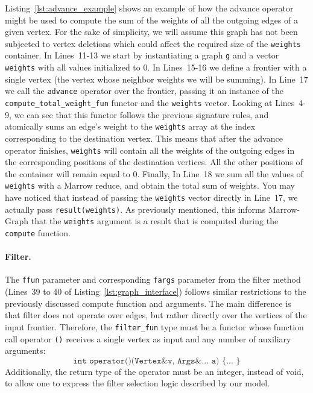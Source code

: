 Listing~\ref{lst:advance_example} shows an example of how the advance operator might be used to compute the sum of the weights of all the outgoing edges of a given vertex. For the sake of simplicity, we will assume this graph has not been subjected to vertex deletions which could affect the required size of the \texttt{weights} container. In Lines~11-13 we start by instantiating a graph \texttt{g} and a vector \texttt{weights} with all values initialized to 0. In Lines~15-16 we define a frontier with a single vertex (the vertex whose neighbor weights we will be summing). In Line~17 we call the \texttt{advance} operator over the frontier, passing it an instance of the \texttt{compute\_total\_weight\_fun} functor and the \texttt{weights} vector. Looking at Lines~4-9, we can see that this functor follows the previous signature rules, and atomically sums an edge's weight to the \texttt{weights} array at the index corresponding to the destination vertex. This means that after the advance operator finishes, \texttt{weights} will contain all the weights of the outgoing edges in the corresponding positions of the destination vertices. All the other positions of the container will remain equal to 0. Finally, In Line~18 we sum all the values of \texttt{weights} with a Marrow reduce, and obtain the total sum of weights. You may have noticed that instead of passing the \texttt{weights} vector directly in Line~17, we actually pass \texttt{result(weights)}. As previously mentioned, this informs Marrow-Graph that the \texttt{weights} argument is a result that is computed during the \texttt{compute} function.

\paragraph{\textbf{Filter}.}
The \texttt{ffun} parameter and corresponding \texttt{fargs} parameter from the filter method (Lines~39 to 40 of Listing~\ref{lst:graph_interface}) follows similar restrictions to the previously discussed compute function and arguments. The main difference is that filter does not operate over edges, but rather directly over the vertices of the input frontier. Therefore, the \texttt{filter\_fun} type must be a functor whose function call operator \texttt{()} receives a single vertex as input and any number of auxiliary arguments: \[\texttt{int operator()(Vertex\& v, Args\&... a) \{ ... \}}\] Additionally, the return type of the operator must be an integer, instead of void, to allow one to express the filter selection logic described by our model. 


